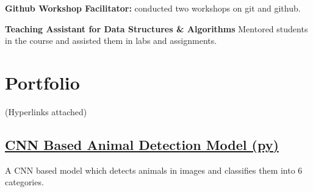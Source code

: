 \documentclass[]{m abbas resume' 2022}
\begin{document}
\begin{minipage}[t]{0.51\textwidth}
\begin{tightemize}
\item \textbf{Github Workshop Facilitator: }conducted two workshops on git and
    github. %
\item \textbf{Teaching Assistant for Data Structures \& Algorithms} Mentored
    students in the course and assisted them in labs and assignments.

\end{tightemize}  
%
%
    

\section{Portfolio} 
    (Hyperlinks attached)

    \subsection{\href{https://github.com/smabbasht/CNN-Based-Animal-Detector}{\textbf{CNN Based Animal Detection Model (py)}}}%
    A CNN based model which detects animals in images and classifies them into 6 categories.


\end{minipage}
\end{document}
